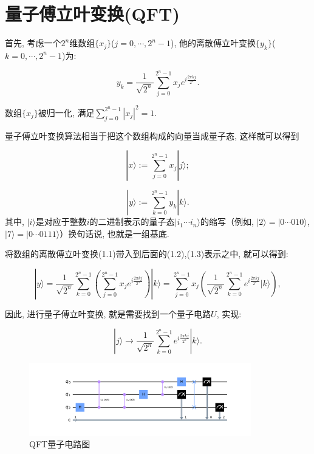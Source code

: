 \section{量子傅立叶变换(QFT)}
首先, 考虑一个$2^n$维数组$\{x_j\}$($j=0, \cdots, 2^n-1$), 他的离散傅立叶变换$\{y_k\}$($k=0, \cdots, 2^n-1$)为:

\begin{equation}
	y_k = \frac{1}{\sqrt{2^n}} \sum_{j=0}^{2^n-1} x_j e^{i \frac{2\pi kj}{2^n}}.
\end{equation}

数组$\{x_j\}$被归一化, 满足$\sum_{j=0}^{2^n-1} |x_j|^2 = 1$.

量子傅立叶变换算法\cite{23}相当于把这个数组构成的向量当成量子态, 这样就可以得到

\begin{equation}
	|x\rangle := \sum_{j=0}^{2^n-1} x_j |j\rangle;
\end{equation}


\begin{equation}
	|y\rangle := \sum_{k=0}^{2^n-1} y_k |k\rangle.
\end{equation}
其中, $|i\rangle$是对应于整数$i$的二进制表示的量子态$|i_1 \cdots i_n\rangle$的缩写（例如, $|2\rangle = |0 \cdots 010\rangle$, $|7\rangle = |0 \cdots 0111\rangle$）换句话说, 也就是一组基底.

将数组的离散傅立叶变换(1.1)带入到后面的(1.2),(1.3)表示之中, 就可以得到:

\begin{equation}
	|y\rangle = \frac{1}{\sqrt{2^n}} \sum_{k=0}^{2^n-1} \left( \sum_{j=0}^{2^n-1} x_j e^{i \frac{2\pi kj}{2^n}} \right) |k\rangle = \sum_{j=0}^{2^n-1} x_j \left( \frac{1}{\sqrt{2^n}} \sum_{k=0}^{2^n-1} e^{i \frac{2\pi kj}{2^n}} |k\rangle \right),
\end{equation}

因此, 进行量子傅立叶变换, 就是需要找到一个量子电路$U$, 实现:

\begin{equation}
	|j\rangle \rightarrow \frac{1}{\sqrt{2^n}} \sum_{k=0}^{2^n-1} e^{i \frac{2\pi kj}{2^n}} |k\rangle.
\end{equation}
\begin{figure}[h]
	\hspace{5pt} %
	\includegraphics[width=0.86\textwidth]{qft.pdf}
	\caption{QFT量子电路图}
	\label{fig:qpe}
\end{figure}

